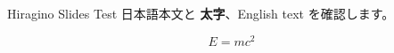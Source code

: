 \documentclass{beamer}
\begin{document}
\begin{frame}{Hiragino Slides Test}
  日本語本文と \textbf{太字}、English text を確認します。

  \[
    E = mc^2
  \]
\end{frame}
\end{document}
